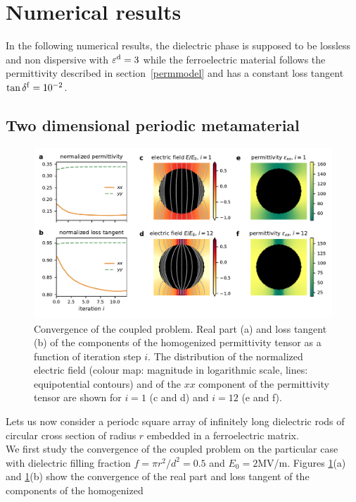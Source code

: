 \documentclass[aps,prb,11pt]{revtex4-1}
\newcommand{\epsd}{\varepsilon^{\rm d}}
\begin{document}
\section{Numerical results}
In the following numerical results, the dielectric phase is supposed to be
lossless and non dispersive with $\epsd = 3$ while the ferroelectric material follows the
permittivity described in section~\ref{permmodel} and has a constant loss
tangent $\tan \delta^{\rm f} = 10^{-2}$.



\subsection{Two dimensional periodic metamaterial}
\begin{figure}[!t]
 \centering
 \includegraphics[width=1\textwidth]{convergence_per}
 \caption{Convergence of the coupled problem.
  Real part (a) and loss tangent (b) of the components of the homogenized
  permittivity tensor as a function of iteration step $i$. The distribution of
  the normalized electric field (colour map: magnitude in logarithmic scale,
  lines: equipotential contours) and of the
  $xx$ component of the permittivity tensor are shown for $i=1$
  (c and d) and $i=12$ (e and f).
 }
 \label{conv2D}
\end{figure}
Lets us now consider a periodc square array of infinitely long dielectric rods of circular cross section
of radius $r$ embedded in a ferroelectric matrix.\\
We first study the convergence of the coupled problem on the particular case with dielectric
filling fraction $f=\pi r^2/d^2=0.5$ and $E_0=2$MV/m. Figures \ref{conv2D}(a) and \ref{conv2D}(b) show the
convergence of the real part and loss tangent of the components of the homogenized
\end{document}
